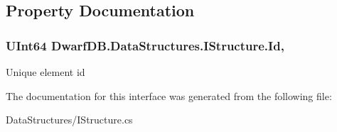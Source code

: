 \subsection{Property Documentation}
\hypertarget{interface_dwarf_d_b_1_1_data_structures_1_1_i_structure_a9fab102fba11f70ab46272b53201784d}{
\subsubsection[{Id}]{\setlength{\rightskip}{0pt plus 5cm}U\+Int64 Dwarf\+D\+B.\+Data\+Structures.\+I\+Structure.\+Id\hspace{0.3cm}{\ttfamily [get]}, {\ttfamily [set]}}}\label{interface_dwarf_d_b_1_1_data_structures_1_1_i_structure_a9fab102fba11f70ab46272b53201784d}


Unique element id 



The documentation for this interface was generated from the following file\+:\begin{DoxyCompactItemize}
\item 
Data\+Structures/I\+Structure.\+cs\end{DoxyCompactItemize}
